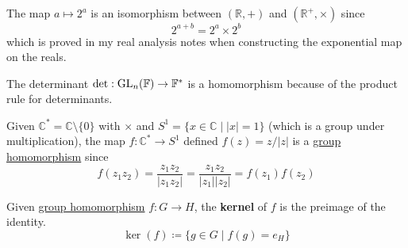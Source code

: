   \begin{example}
    \label{ex:exponential-map}
    The map $a \mapsto 2^{a}$ is an isomorphism between $(\mathbb{R}, +)$ and $(\mathbb{R}^{+}, \times)$ since 
    \begin{equation}
      2^{a+b} = 2^a \times 2^b
    \end{equation} 
    which is proved in my real analysis notes when constructing the exponential map on the reals. 
  \end{example} 

  \begin{example}[Determinant]
    \label{ex:determinant}
    The determinant $\det: \operatorname{GL}_n (\mathbb{F}) \rightarrow \mathbb{F}^\ast$ is a homomorphism because of the product rule for determinants. 
  \end{example}

  \begin{example}
    \label{ex:projection-onto-unit-circle}
    Given $\mathbb{C}^\ast = \mathbb{C} \setminus \{0\}$ with $\times$ and $S^1 = \{x \in \mathbb{C} \mid |x| = 1\}$ (which is a group under multiplication), the map $f: \mathbb{C}^\ast \rightarrow S^1$ defined $f(z) = z/|z|$ is a \hyperref[def:group-homomorphism]{group homomorphism} since 
    \begin{equation}
      f(z_1 z_2) = \frac{z_1 z_2}{|z_1 z_2|} = \frac{z_1 z_2}{|z_1| |z_2|} = f(z_1) f(z_2)
    \end{equation}
  \end{example} 

  \begin{definition}[Kernel]
    \label{def:kernel}
    Given \hyperref[def:group-homomorphism]{group homomorphism} $f: G \rightarrow H$, the \textbf{kernel} of $f$ is the preimage of the identity. 
    \begin{equation}
      \ker(f) \coloneqq \{g \in G \mid f(g) = e_H\}
    \end{equation}
  \end{definition} 

